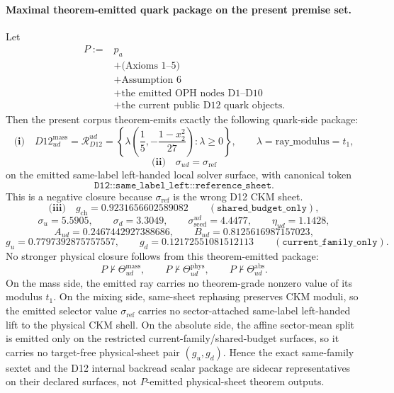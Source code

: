 \documentclass[11pt]{article}
\begin{document}
\paragraph{Maximal theorem-emitted quark package on the present premise set.}
Let
\[
\begin{aligned}
P:={}&p_a\\
&+\text{(Axioms 1--5)}\\
&+\text{Assumption 6}\\
&+\text{the emitted OPH nodes D1--D10}\\
&+\text{the current public D12 quark objects}.
\end{aligned}
\]
Then the present corpus theorem-emits exactly the following quark-side package:
\[
\textbf{(i)}\quad
D12_{ud}^{\mathrm{mass}}
=
\mathcal R_{D12}^{ud}
=
\left\{
\lambda\left(\frac15,-\frac{1-x_2^2}{27}\right):\lambda\ge0
\right\},
\qquad
\lambda=\mathrm{ray\_modulus}=t_1,
\]
\[
\textbf{(ii)}\quad
\sigma_{ud}=\sigma_{\mathrm{ref}}
\]
on the emitted same-label left-handed local solver surface, with canonical token
\[
\texttt{D12::same\_label\_left::reference\_sheet}.
\]
This is a negative closure because \(\sigma_{\mathrm{ref}}\) is the wrong D12 CKM sheet.
\[
\textbf{(iii)}\quad
g_{\mathrm{ch}}=0.9231656602589082
\qquad
(\texttt{shared\_budget\_only}),
\]
\[
\sigma_u=5.5905,\qquad
\sigma_d=3.3049,\qquad
\sigma_{\mathrm{seed}}^{ud}=4.4477,\qquad
\eta_{ud}=1.1428,
\]
\[
A_{ud}=0.2467442927388686,
\qquad
B_{ud}=0.8125616987157023,
\]
\[
g_u=0.7797392875757557,
\qquad
g_d=0.12172551081512113
\qquad
(\texttt{current\_family\_only}).
\]
No stronger physical closure follows from this theorem-emitted package:
\[
P\nvdash
\Theta_{ud}^{\mathrm{mass}},
\qquad
P\nvdash
\Theta_{ud}^{\mathrm{phys}},
\qquad
P\nvdash
\Theta_{ud}^{\mathrm{abs}}.
\]
On the mass side, the emitted ray carries no theorem-grade nonzero value of its modulus \(t_1\). On the mixing side, same-sheet rephasing preserves CKM moduli, so the emitted selector value \(\sigma_{\mathrm{ref}}\) carries no sector-attached same-label left-handed lift to the physical CKM shell. On the absolute side, the affine sector-mean split is emitted only on the restricted current-family/shared-budget surfaces, so it carries no target-free physical-sheet pair \((g_u,g_d)\). Hence the exact same-family sextet and the D12 internal backread scalar package are sidecar representatives on their declared surfaces, not \(P\)-emitted physical-sheet theorem outputs.
\end{document}
